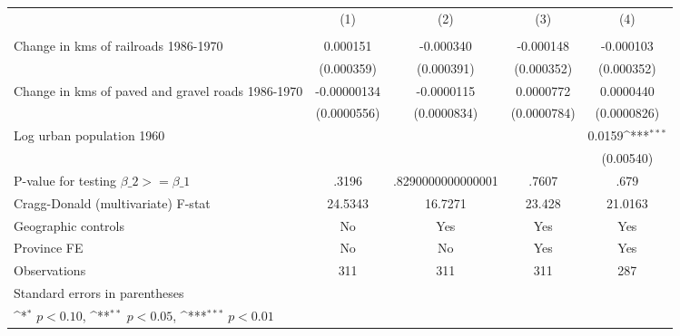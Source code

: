 {
\def\sym#1{\ifmmode^{#1}\else\(^{#1}\)\fi}
\begin{tabular}{l*{4}{c}}
\hline\hline
                &\multicolumn{1}{c}{(1)}&\multicolumn{1}{c}{(2)}&\multicolumn{1}{c}{(3)}&\multicolumn{1}{c}{(4)}\\
                &\multicolumn{1}{c}{}&\multicolumn{1}{c}{}&\multicolumn{1}{c}{}&\multicolumn{1}{c}{}\\
\hline
Change in kms of railroads 1986-1970& 0.000151         &-0.000340         &-0.000148         &-0.000103         \\
                &(0.000359)         &(0.000391)         &(0.000352)         &(0.000352)         \\
[1em]
Change in kms of paved and gravel roads 1986-1970&-0.00000134         &-0.0000115         &0.0000772         &0.0000440         \\
                &(0.0000556)         &(0.0000834)         &(0.0000784)         &(0.0000826)         \\
[1em]
Log urban population 1960&                  &                  &                  &   0.0159\sym{***}\\
                &                  &                  &                  &(0.00540)         \\
\hline
P-value for testing $\beta\_{2} >= \beta\_{1}$&    .3196         &.8290000000000001         &    .7607         &     .679         \\
Cragg-Donald (multivariate) F-stat&  24.5343         &  16.7271         &   23.428         &  21.0163         \\
Geographic controls&       No         &      Yes         &      Yes         &      Yes         \\
Province FE     &       No         &       No         &      Yes         &      Yes         \\
Observations    &      311         &      311         &      311         &      287         \\
\hline\hline
\multicolumn{5}{l}{\footnotesize Standard errors in parentheses}\\
\multicolumn{5}{l}{\footnotesize \sym{*} \(p<0.10\), \sym{**} \(p<0.05\), \sym{***} \(p<0.01\)}\\
\end{tabular}
}
